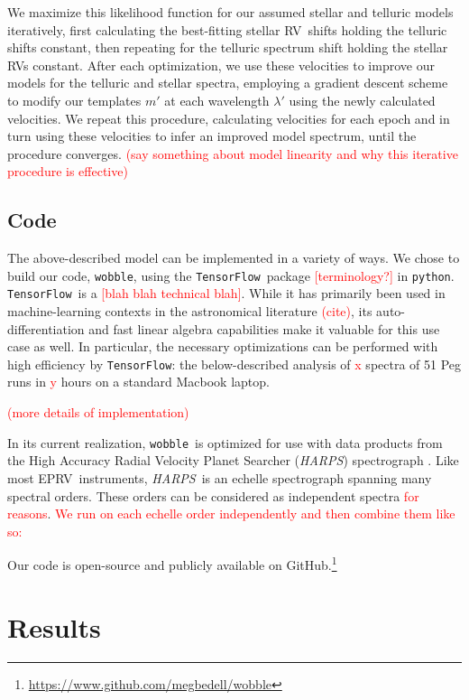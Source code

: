 \documentclass[twocolumn]{aastex62}
\newcommand{\todo}[1]{\textcolor{red}{#1}}  %
\newcommand{\acronym}[1]{{\small{#1}}}
\newcommand{\project}[1]{\textsl{#1}}
\newcommand{\code}[1]{\texttt{#1}}
\newcommand{\HARPS}{\project{\acronym{HARPS}}}
\newcommand{\RV}{\acronym{RV}}
\newcommand{\EPRV}{\acronym{EPRV}}
\newcommand{\wobble}{\code{wobble}}
\newcommand{\TF}{\code{TensorFlow}}
\begin{document}
We maximize this likelihood function for our assumed stellar and telluric models iteratively, first calculating the best-fitting stellar \RV\ shifts holding the telluric shifts constant, then repeating for the telluric spectrum shift holding the stellar \RV s constant.
After each optimization, we use these velocities to improve our models for the telluric and stellar spectra, employing a gradient descent scheme to modify our templates $m'$ at each wavelength $\lambda'$ using the newly calculated velocities.
We repeat this procedure, calculating velocities for each epoch and in turn using these velocities to infer an improved model spectrum, until the procedure converges. 
\todo{(say something about model linearity and why this iterative procedure is effective)}

\subsection{Code}

The above-described model can be implemented in a variety of ways. We chose to build our code, \wobble, using the \TF\ package \todo{[terminology?]} in \code{python}. \TF\ is a \todo{[blah blah technical blah]}. While it has primarily been used in machine-learning contexts in the astronomical literature \todo{(cite)}, its auto-differentiation and fast linear algebra capabilities make it valuable for this use case as well. In particular, the necessary optimizations can be performed with high efficiency by \TF: the below-described analysis of \todo{x} spectra of 51 Peg runs in \todo{y} hours on a standard Macbook laptop.

\todo{(more details of implementation)}

In its current realization, \wobble\ is optimized for use with data products from the High Accuracy Radial Velocity Planet Searcher (\HARPS) spectrograph \citep{Mayor2003}. Like most \EPRV\ instruments, \HARPS\ is an echelle spectrograph spanning many spectral orders. These orders can be considered as independent spectra \todo{for reasons}. \todo{We run on each echelle order independently and then combine them like so:}


Our code is open-source and publicly available on GitHub.\footnote{\url{https://www.github.com/megbedell/wobble}}



\section{Results}
\label{s:results}
\end{document}
